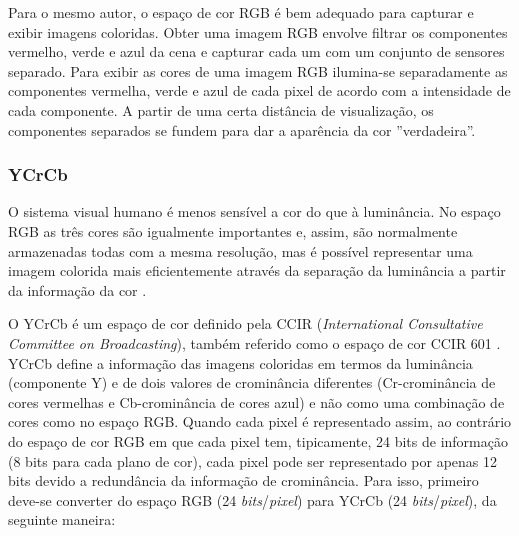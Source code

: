 Para o mesmo autor, o espaço de cor RGB é bem adequado para capturar e exibir imagens coloridas. Obter uma imagem RGB envolve filtrar os componentes vermelho, verde e azul da cena e capturar cada um com um conjunto de sensores separado. Para exibir as cores de uma imagem RGB ilumina-se separadamente as componentes vermelha, verde e azul de cada pixel de acordo com a intensidade de cada componente. A partir de uma certa distância de visualização, os componentes separados se fundem para dar a aparência da cor ''verdadeira''. 

\subsubsection{YCrCb}
O sistema visual humano é menos sensível a cor do que à luminância. No espaço RGB as três cores são igualmente importantes e, assim, são normalmente armazenadas todas com a mesma resolução, mas é possível representar uma imagem colorida mais eficientemente através da separação da luminância a partir da informação da cor \cite{richardson2011h}.

O YCrCb é um espaço de cor definido pela CCIR (\textit{International Consultative Committee on Broadcasting}), também referido como o espaço de cor CCIR 601 \cite{acharya2002integrated}. YCrCb define a informação  das imagens coloridas  em termos da luminância (componente Y) e de dois valores de crominância diferentes (Cr-crominância de cores vermelhas e Cb-crominância de cores azul) e não como uma combinação de cores como no espaço RGB. Quando cada pixel é representado assim, ao contrário do espaço de cor RGB em que cada pixel tem, tipicamente, 24 bits de informação (8 bits para cada plano de cor), cada pixel pode ser representado por apenas 12 bits devido a redundância da informação de crominância. Para isso, primeiro deve-se converter do espaço RGB (24 \textit{bits}/\textit{pixel}) para YCrCb (24 \textit{bits}/\textit{pixel}), da seguinte maneira:

